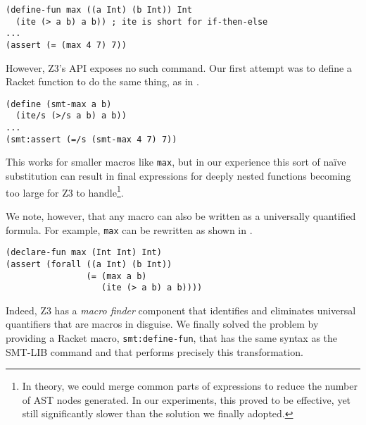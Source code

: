 \begin{program}
\caption{An SMT-LIB macro, defined with \texttt{define-fun}}
\label{fig:smtlib-max}
\begin{verbatim}
(define-fun max ((a Int) (b Int)) Int
  (ite (> a b) a b)) ; ite is short for if-then-else
...
(assert (= (max 4 7) 7))
\end{verbatim}
\end{program}

However, Z3's API exposes no such command. Our first attempt was to define a
Racket function to do the same thing, as in .

\begin{program}
\caption{A first attempt at ``macros" in \texttt{z3.rkt}}
\label{fig:rkt-max-fn}
\begin{verbatim}
(define (smt-max a b)
  (ite/s (>/s a b) a b))
...
(smt:assert (=/s (smt-max 4 7) 7))
\end{verbatim}
\end{program}

This works for smaller macros like \texttt{max}, but in our experience this
sort of na\"{i}ve substitution can result in final expressions for deeply
nested functions becoming too large for Z3 to handle\footnote{In theory, we
could merge common parts of expressions to reduce the number of AST nodes
generated. In our experiments, this proved to be effective, yet still
significantly slower than the solution we finally adopted.}.

We note, however, that any macro can also be written as a universally
quantified formula. For example, \texttt{max} can be rewritten as shown in
.

\begin{program}
\caption{Macros as universally quantified formulas}
\label{fig:max-forall}
\begin{verbatim}
(declare-fun max (Int Int) Int)
(assert (forall ((a Int) (b Int))
                (= (max a b)
                   (ite (> a b) a b))))
\end{verbatim}
\end{program}

Indeed, Z3 has a \textit{macro finder} component that identifies and
eliminates universal quantifiers that are macros in disguise. We finally
solved the problem by providing a Racket macro, \texttt{smt:define-fun}, that
has the same syntax as the SMT-LIB command and that performs precisely this
transformation.

